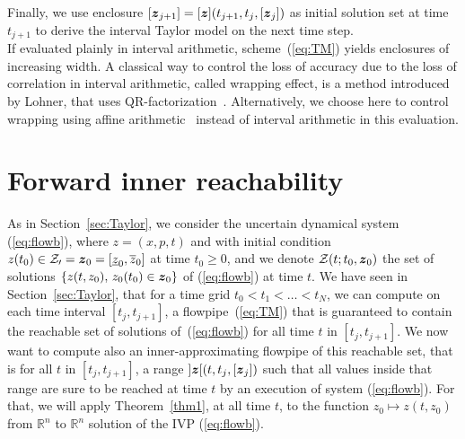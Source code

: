 \documentclass{sig-alternate-05-2015}
\newcommand\ForAuthors[1]%
 {\par\smallskip                     %
  \begin{center}%
   \fbox%
   {\parbox{0.9\linewidth}%
    {\raggedright\sc--- #1}%
   }%
  \end{center}%
  \par\smallskip                     %
 }
\def\R{{\mathbb R}}
\newcommand{\addTODO}[1]{\addcontentsline{tdo}{toc}{#1}}
\newcommand{\TODO}[1]{{\bf{\scriptsize #1}\addTODO{#1}}}
\newcommand{\SP}[1]{\TODO{Sylvie : #1}}
\begin{document}

Finally, we use enclosure $[{\z}_{j+1}]=[\z](t_{j+1},t_j,[{\z}_j])$ as initial solution set at time $t_{j+1}$ to derive the interval Taylor model on the next time step. \\

If evaluated plainly in interval arithmetic, scheme~(\ref{eq:TM}) yields enclosures of increasing width. A classical way to control the loss 
of accuracy due to the loss of correlation in interval arithmetic, called wrapping effect, is a method introduced by Lohner, that uses QR-factorization~\cite{Nedialkov99}.
Alternatively, we choose here to control wrapping using affine arithmetic~\cite{com-sto-93-aa} instead of interval arithmetic in this evaluation. 

\section{Forward inner reachability}
\label{sec:inner_reachability}

As in Section~\ref{sec:Taylor}, we consider the uncertain dynamical system (\ref{eq:flowb}), where $z=(x,p,t)$ and with initial condition 
$z(t_0) \in {\cal Z_0} = \z_0=[\underline{z}_0,\overline{z}_0]$ at time $t_0 \geq 0$, and we denote ${\cal Z}(t;t_0, \z_0)$
 the set of solutions $\{ z(t,z_0), \, z_0(t_0) \in \z_0 \}$ of  (\ref{eq:flowb}) at time $t$. 
We have seen in  Section~\ref{sec:Taylor}, that for a  time grid $t_0 < t_1 < \ldots < t_N$, we can compute on each time interval  $[t_j,t_{j+1}]$,
a flowpipe~(\ref{eq:TM}) 
that is guaranteed to contain the reachable set of solutions of~(\ref{eq:flowb}) for all time $t$ in $[t_j,t_{j+1}]$. 
We now want to compute also an inner-approximating flowpipe of this reachable set, that is for all $t$ in $[t_j,t_{j+1}]$, 
a range $]\z[(t,t_j,[\z_j])$ such that all values inside that range are sure to be reached at time $t$ by an execution of system (\ref{eq:flowb}).
For that, we will apply Theorem~\ref{thm1}, at all time $t$, to the function $z_0 \mapsto z(t,z_0)$ from $\R^n$ to $\R^n$
 solution of the IVP (\ref{eq:flowb}). 
\end{document}
